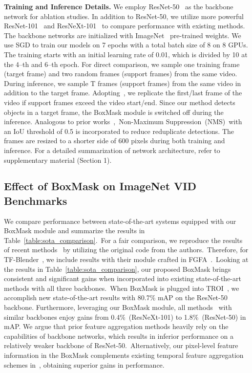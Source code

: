 \documentclass[10pt,twocolumn,letterpaper]{article}
\begin{document}
\vspace{3pt}
\noindent \textbf{Training and Inference Details.}
We employ ResNet-50~\cite{he2016deep} as the backbone network for ablation studies. In addition to ResNet-50, we utilize more powerful ResNet-101~\cite{he2016deep} and ResNeXt-101~\cite{xie2017aggregated} to compare performance with existing methods. The backbone networks are initialized with ImageNet~\cite{krizhevsky2012imagenet} pre-trained weights. We use SGD to train our models on 7 epochs with a total batch size of 8 on 8 GPUs. The training starts with an initial learning rate of 0.01, which is divided by 10 at the 4--th and 6--th epoch. For direct comparison, we sample one training frame (target frame) and two random frames (support frames) from the same video. During inference, we sample T frames (support frames) from the same video in addition to the target frame. Adopting~\cite{bertasius2018object, gong2021temporal}, we replicate the first/last frame of the video if support frames exceed the video start/end. Since our method detects objects in a target frame, the BoxMask module is switched off during the inference. Analogous to prior works~\cite{gong2021temporal,wu2019sequence, zhu2017flow},~Non-Maximum Suppression~(NMS)~with an IoU threshold of 0.5 is incorporated to reduce reduplicate detections. The frames are resized to a shorter side of 600 pixels during both training and inference. For a detailed summarization of network architecture, refer to supplementary material (Section 1).

\subsection{Effect of BoxMask on ImageNet VID Benchmarks}
We compare performance between state-of-the-art systems equipped with our BoxMask module and summarize the results in Table~\ref{table:sota_comparison}.~For a fair comparison, we reproduce the results of recent methods~\cite{chen2020memory, cui2021tf, gong2021temporal, wu2019sequence, zhu2017flow} by utilizing the original code from the authors.~Therefore, for TF-Blender~\cite{cui2021tf}, we include results with their module crafted in FGFA~\cite{zhu2017flow}.~Looking at the results in Table~\ref{table:sota_comparison}, our proposed BoxMask brings consistent and significant gains when incorporated into existing state-of-the-art methods with all three backbones.~When BoxMask is plugged into TROI~\cite{gong2021temporal}, we accomplish new state-of-the-art results with 80.7\% mAP on the ResNet-50 backbone. Furthermore, leveraging our BoxMask module, all methods~\cite{chen2020memory, cui2021tf, gong2021temporal, wu2019sequence, zhu2017flow} with similar backbones enjoy gains from 0.4\%~(ResNeXt-101) to 1.8\%~(ResNet-50) in mAP. We argue that prior feature aggregation methods heavily rely on the capabilities of backbone networks, which results in inferior performance on a relatively weaker backbone of ResNet-50.~Alternatively, our pixel-level feature information in the BoxMask complements existing temporal feature aggregation schemes in~\cite{wu2019sequence, gong2021temporal}, obtaining superior gains in performance. 
\end{document}
